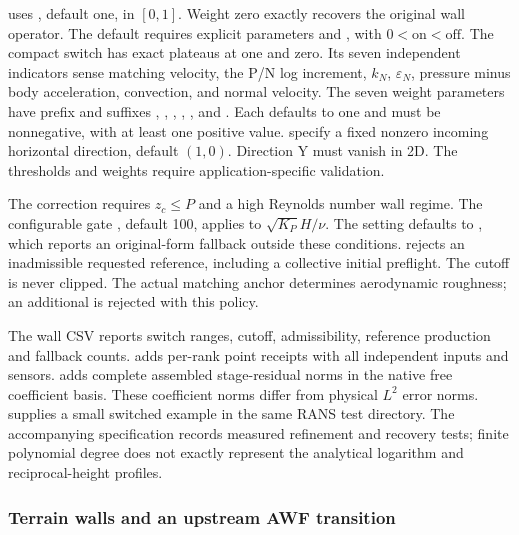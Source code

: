  uses , default one,
in $[0,1]$. Weight zero exactly recovers the original wall operator.
The default  requires explicit parameters
 and , with $0<\mathrm{on}<\mathrm{off}$.
The compact switch has exact plateaus at one and zero. Its seven independent
indicators sense matching velocity, the P/N log increment, $k_N$,
$\varepsilon_N$, pressure minus body acceleration, convection, and normal
velocity. The seven weight parameters have prefix 
and suffixes , , , ,
,  and . Each defaults to
one and must be nonnegative, with at least one positive value.
 specify a fixed nonzero
incoming horizontal direction, default $(1,0)$. Direction Y must vanish in
2D. The thresholds and weights require application-specific validation.

The correction requires $z_c\leq P$ and a high Reynolds number wall regime.
The configurable gate , default 100, applies to
$\sqrt{K_P}H/\nu$. The  setting defaults to
, which reports an original-form fallback outside these conditions.
 rejects an inadmissible requested reference,
including a collective initial preflight. The cutoff is never clipped.
The actual matching anchor determines aerodynamic roughness; an additional
 is rejected with this policy.

The wall CSV reports switch ranges, cutoff, admissibility, reference production
and fallback counts.  adds per-rank point
receipts with all independent inputs and sensors. 
adds complete assembled stage-residual norms in the native free coefficient
basis. These coefficient norms differ from physical $L^2$ error norms.
 supplies a small switched example in the same
RANS test directory. The accompanying specification records measured
refinement and recovery tests; finite polynomial degree does not exactly
represent the analytical logarithm and reciprocal-height profiles.

\subsubsection{Terrain walls and an upstream AWF transition}

